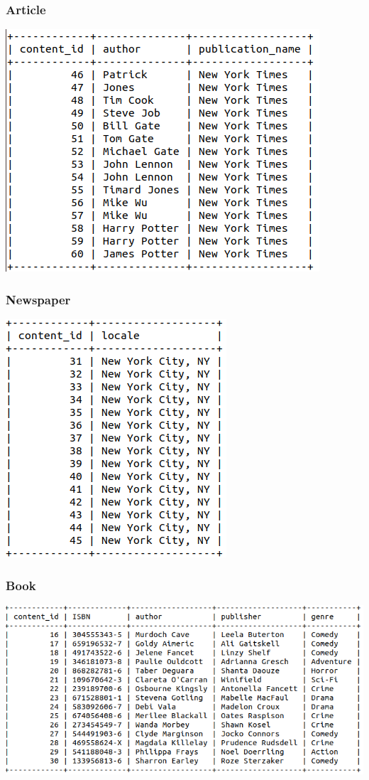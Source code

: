 \documentclass[letter, 12pt, titlepage]{article}
\begin{document}
		\subsubsection{Article}
			\includegraphics[scale=.5]{article.png}
		\subsubsection{Newspaper}
			\includegraphics[scale=.5]{newspaper.png}
		\subsubsection{Book}
			\includegraphics[scale=.5]{book.png}
\end{document}
